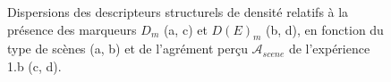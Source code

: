 \begin{figure}[t]
        \myfloatalign
        \par
       \caption{Dispersions des descripteurs structurels de densité relatifs à la présence des marqueurs $D_m$ (a, c) et $D(E)_m$ (b, d), en fonction du type de scènes (a, b) et de l'agrément perçu $\mathcal{A}_{scene}$ de l'expérience 1.b (c, d).}\label{fig:densityMarker}
\end{figure}

